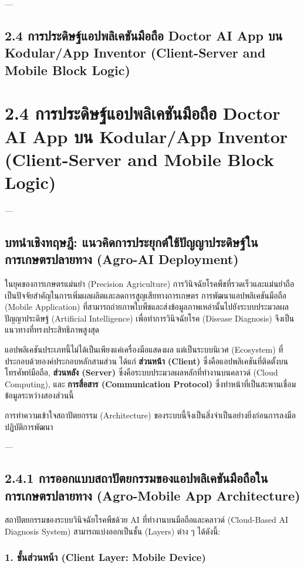 \documentclass[11pt,a4paper,openany]{report}
\begin{document}
---

\section{2.4 การประดิษฐ์แอปพลิเคชันมือถือ Doctor AI App บน Kodular/App Inventor (Client-Server and Mobile Block Logic)}


\chapter{2.4 การประดิษฐ์แอปพลิเคชันมือถือ Doctor AI App บน Kodular/App Inventor (Client-Server and Mobile Block Logic)}


---

\section{บทนำเชิงทฤษฎี: แนวคิดการประยุกต์ใช้ปัญญาประดิษฐ์ในการเกษตรปลายทาง (Agro-AI Deployment)}


ในยุคของการเกษตรแม่นยำ (Precision Agriculture) การวินิจฉัยโรคพืชที่รวดเร็วและแม่นยำถือเป็นปัจจัยสำคัญในการเพิ่มผลผลิตและลดการสูญเสียทางการเกษตร การพัฒนาแอปพลิเคชันมือถือ (Mobile Application) ที่สามารถถ่ายภาพใบพืชและส่งข้อมูลภาพเหล่านั้นไปยังระบบประมวลผลปัญญาประดิษฐ์ (Artificial Intelligence) เพื่อทำการวินิจฉัยโรค (Disease Diagnosis) จึงเป็นแนวทางที่ทรงประสิทธิภาพสูงสุด

แอปพลิเคชันประเภทนี้ไม่ได้เป็นเพียงแค่เครื่องมือแสดงผล แต่เป็นระบบนิเวศ (Ecosystem) ที่ประกอบด้วยองค์ประกอบหลักสามส่วน ได้แก่ \textbf{ส่วนหน้า (Client)} ซึ่งคือแอปพลิเคชันที่ติดตั้งบนโทรศัพท์มือถือ, \textbf{ส่วนหลัง (Server)} ซึ่งคือระบบประมวลผลหลักที่ทำงานบนคลาวด์ (Cloud Computing), และ \textbf{การสื่อสาร (Communication Protocol)} ซึ่งทำหน้าที่เป็นสะพานเชื่อมข้อมูลระหว่างสองส่วนนี้

การทำความเข้าใจสถาปัตยกรรม (Architecture) ของระบบนี้จึงเป็นสิ่งจำเป็นอย่างยิ่งก่อนการลงมือปฏิบัติการพัฒนา

---

\section{2.4.1 การออกแบบสถาปัตยกรรมของแอปพลิเคชันมือถือในการเกษตรปลายทาง (Agro-Mobile App Architecture)}


สถาปัตยกรรมของระบบวินิจฉัยโรคพืชด้วย AI ที่ทำงานบนมือถือและคลาวด์ (Cloud-Based AI Diagnosis System) สามารถแบ่งออกเป็นชั้น (Layers) ต่าง ๆ ได้ดังนี้:

\subsection{1. ชั้นส่วนหน้า (Client Layer: Mobile Device)}
\end{document}
